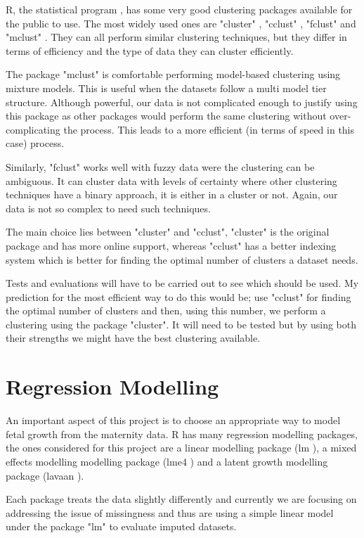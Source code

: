 \documentclass[bsc]{abdnthesis}
\begin{document}
R, the statistical program \cite{R}, has some very good clustering packages available \cite{ cran} for the public to use. The most widely used ones are "cluster" \cite{clust-cluster}, "cclust" \cite{ clust-cclust}, "fclust" \cite{ clust-fclust} and "mclust" \cite{ clust-mclust}. They can all perform similar clustering techniques, but they differ in terms of efficiency and the type of data they can cluster efficiently. 

The package "mclust" is comfortable performing model-based clustering using mixture models. This is useful when the datasets follow a multi model tier structure. Although powerful, our data is not complicated enough to justify using this package as other packages would perform the same clustering without over-complicating the process. This leads to a more efficient (in terms of speed in this case) process. 

Similarly, "fclust" works well with fuzzy data were the clustering can be ambiguous. It can cluster data with levels of certainty where other clustering techniques have a binary approach, it is either in a cluster or not. Again, our data is not so complex to need such techniques. 

The main choice lies between "cluster" and "cclust", "cluster" is the original package and has more online support, whereas "cclust" has a better indexing system which is better for finding the optimal number of clusters a dataset needs. 

Tests and evaluations will have to be carried out to see which should be used. My prediction for the most efficient way to do this would be; use "cclust" for finding the optimal number of clusters and then, using this number, we perform a clustering using the package "cluster". It will need to be tested but by using both their strengths we might have the best clustering available.
\section{Regression Modelling} %
\label{sec:regression_modelling}
An important aspect of this project is to choose an appropriate way to model fetal growth from the maternity data. R has many regression modelling packages, the ones considered for this project are a linear modelling package (lm \cite{lm}), a mixed effects modelling modelling package (lme4 \cite{lme4}) and a latent growth modelling package (lavaan \cite{lavaan}). 

Each package treats the data slightly differently and currently we are focusing on addressing the issue of missingness and thus are using a simple linear model under the package "lm" to evaluate imputed datasets. 
\end{document}
